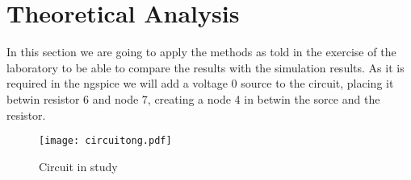 \section{Theoretical Analysis}
\label{sec:analysis}

In this section we are going to apply the methods as told in the exercise of the laboratory to be able to compare the results with the simulation results. As it is required in the ngspice we will add a voltage 0 source to the circuit, placing it betwin resistor 6 and node 7, creating a node 4 in betwin the sorce and the resistor.

\begin{figure}[h] \centering
\texttt{[image: circuitong.pdf]}
\caption{Circuit in study}
\label{fig:circuit_t2}
\end{figure}



